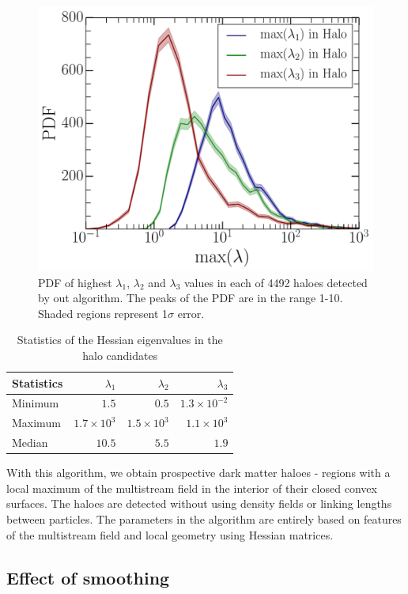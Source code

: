 {\begin{figure}
\begin{minipage}[t]{.99\linewidth}
 \centering\includegraphics[width=10.cm]{Chapter5/Source_v2/fig4.pdf} 
\end{minipage}\hfill
\caption{PDF of highest $\lambda_1$, $\lambda_2$ and $\lambda_3$ values in each of 4492 haloes detected by out algorithm. The peaks of the PDF are in the range 1-10. Shaded regions represent 1$\sigma$ error. }
\label{fig:maxL3}
\end{figure}

\begin{table}
\centering
  \caption{Statistics of the Hessian eigenvalues in the halo candidates}
\begin{tabular}{|l|r|r|r|}
\hline
Statistics                &  $\lambda_1$ &  $\lambda_2$ &  $\lambda_3$\\ \hline
Minimum   & $ 1.5 $ & $ 0.5 $ & $ 1.3 \times 10^{-2} $  \\ \hline
Maximum  & $1.7 \times 10^3$  & $1.5 \times 10^3$ & $1.1 \times 10^3$     \\ \hline
Median     & $10.5$  & $5.5$ & $1.9$  \\ \hline
\end{tabular}
\label{tab:maxL3}
\end{table}

 
With this algorithm, we obtain prospective dark matter haloes - regions with a local maximum of the multistream field in the interior of their closed convex surfaces. The haloes are detected without using density fields or linking lengths between particles. The parameters in the algorithm are entirely based on features of the multistream field and local geometry using Hessian matrices. 


\subsection{Effect of smoothing}
\label{sub:Smooth}


}
